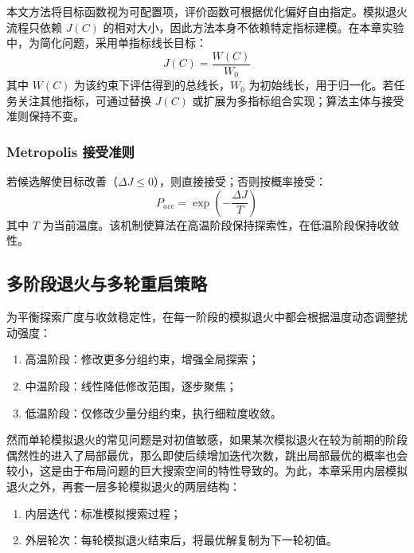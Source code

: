 本文方法将目标函数视为可配置项，评价函数可根据优化偏好自由指定。模拟退火流程只依赖 $J(C)$ 的相对大小，因此方法本身不依赖特定指标建模。在本章实验中，为简化问题，采用单指标线长目标：
\begin{equation}
\label{eq:chap4-objective}
J(C)=\frac{W(C)}{W_0}
\end{equation}
其中 $W(C)$ 为该约束下评估得到的总线长，$W_0$ 为初始线长，用于归一化。若任务关注其他指标，可通过替换 $J(C)$ 或扩展为多指标组合实现；算法主体与接受准则保持不变。

\subsubsection{Metropolis 接受准则}
\label{sec:chap4-metropolis}

若候选解使目标改善（$\Delta J\le 0$），则直接接受；否则按概率接受：
\begin{equation}
\label{eq:chap4-metropolis}
P_{acc}=\exp\left(-\frac{\Delta J}{T}\right)
\end{equation}
其中 $T$ 为当前温度。该机制使算法在高温阶段保持探索性，在低温阶段保持收敛性。

\subsection{多阶段退火与多轮重启策略}
\label{sec:chap4-multi-round}

为平衡探索广度与收敛稳定性，在每一阶段的模拟退火中都会根据温度动态调整扰动强度：
\begin{enumerate}
    \item 高温阶段：修改更多分组约束，增强全局探索；
    \item 中温阶段：线性降低修改范围，逐步聚焦；
    \item 低温阶段：仅修改少量分组约束，执行细粒度收敛。
\end{enumerate}





然而单轮模拟退火的常见问题是对初值敏感，如果某次模拟退火在较为前期的阶段偶然性的进入了局部最优，那么即使后续增加迭代次数，跳出局部最优的概率也会较小，这是由于布局问题的巨大搜索空间的特性导致的。为此，本章采用内层模拟退火之外，再套一层多轮模拟退火的两层结构：
\begin{enumerate}
    \item 内层迭代：标准模拟搜索过程；
    \item 外层轮次：每轮模拟退火结束后，将最优解复制为下一轮初值。
\end{enumerate}


